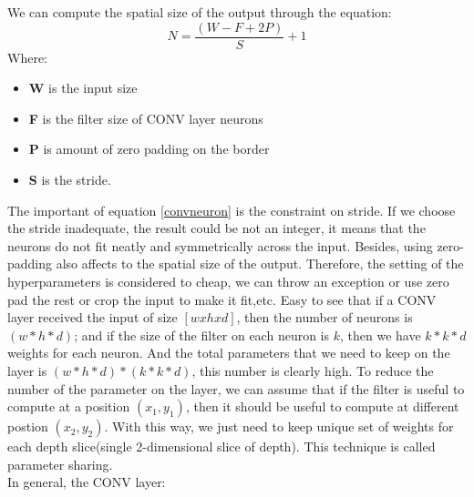 We can compute the spatial size of the output through the equation:
\begin{equation}
	N = \frac{(W - F + 2P)}{S} + 1
	\label{convneuron}
\end{equation}
Where:
\begin{itemize}
	\item \textbf{W} is the input size
	\item \textbf{F} is the filter size of CONV layer neurons
	\item \textbf{P} is amount of zero padding on the border
	\item \textbf{S} is the stride.
\end{itemize}
The important of equation \ref{convneuron} is the constraint on stride. If we choose the stride inadequate, the result could be not an integer, it means that the neurons do not fit neatly and symmetrically across the input. Besides, using zero-padding also affects to the spatial size of the output. Therefore, the setting of the hyperparameters is considered to cheap, we can throw an exception or use zero pad the rest or crop the input to make it fit,etc. 
Easy to see that if a CONV layer received the input of size $[w x h x d]$, then the number of neurons is $(w * h * d)$; and if the size of the filter on each neuron is $k$, then we have $k * k * d$ weights for each neuron. And the total parameters that we need to keep on the layer is $(w * h * d) * (k * k * d)$, this number is clearly high. To reduce the number of the parameter on the layer, we can assume that if the filter is useful to compute at a position $(x_1,y_1)$, then it should be useful to compute at different postion $(x_2,y_2)$. With this way, we just need to keep unique set of weights for each depth slice(single 2-dimensional slice of depth). This technique is called parameter sharing.\\[0.2cm]
In general, the CONV layer:

